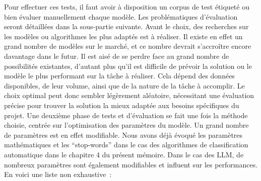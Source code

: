 Pour effectuer ces tests, il faut avoir à disposition un corpus de test étiqueté ou bien évaluer manuellement chaque modèle. 
Les problématiques d'évaluation seront détaillées dans la sous-partie suivante. 
Avant le choix, des recherches sur les modèles ou algorithmes les plus adaptés est à réaliser. 
Il existe en effet un grand nombre de modèles sur le marché, et ce nombre devrait s'accroître encore davantage dans le futur.
Il est aisé de se perdre face au grand nombre de possibilités existantes, d'autant plus qu'il est difficile de prévoir la solution ou le modèle le plus performant sur la tâche à réaliser. 
Cela dépend des données disponibles, de leur volume, ainsi que de la nature de la tâche à accomplir. Le choix optimal peut donc sembler légèrement aléatoire, nécessitant une évaluation précise pour trouver la solution la mieux adaptée aux besoins spécifiques du projet.
Une deuxième phase de tests et d'évaluation se fait une fois la méthode choisie, centrée sur l'optimisation des paramètres du modèle. 
Un grand nombre de paramètres est en effet modifiable. 
Nous avons déjà évoqué les paramètres mathématiques et les \enquote{\gls{stop-words}} dans le cas des algorithmes de classification automatique dans le chapitre 4 du présent mémoire. 
Dans le cas des \gls{LLM}, de nombreux paramètres sont également modifiables et influent sur les performances. 
En voici une liste non exhaustive~:

